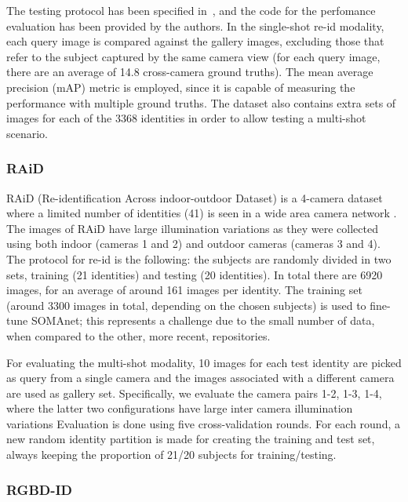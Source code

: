 \documentclass[10pt,journal,letterpaper,compsoc]{IEEEtran}
\begin{document}

The testing protocol has been specified in~\cite{market}, and the code for the perfomance evaluation has been provided by the authors. In the single-shot re-id modality, each query image is compared against the gallery images, excluding those that refer to the subject captured by the same camera view (for each query image, there are an average of 14.8 cross-camera ground truths). The mean average precision (mAP) metric is employed, since it is capable of measuring the performance with multiple ground truths.
The dataset also contains extra sets of images for each of the 3368 identities in order to allow testing a multi-shot scenario.




\subsubsection{RAiD}
RAiD (Re-identification Across indoor-outdoor Dataset) is a 4-camera dataset where a limited number of identities (41) is seen in a wide area camera network \cite{Das2014}. The images of RAiD  have  large  illumination  variations  as  they  were  collected  using  both indoor  (cameras  1  and  2)  and  outdoor  cameras  (cameras  3  and  4). The protocol for re-id is the following: the subjects are randomly divided  in two sets, training (21 identities) and testing (20 identities). In total there are 6920 images, for an average of around 161 images per identity.  The training set (around 3300 images in total, depending on the chosen subjects) is used to fine-tune SOMAnet; this represents a challenge due to the small number of data, when compared to the other, more recent, repositories.

For evaluating the multi-shot modality, 10 images for each test identity are picked as query from a single camera and the images associated with a different camera are used as gallery set. Specifically, we evaluate the camera pairs 1-2, 1-3, 1-4, where the latter two configurations have large inter camera illumination variations
Evaluation is done using five cross-validation rounds. For each round, a new random identity partition is made for creating the training and test set, always keeping the proportion of 21/20 subjects for training/testing.

\subsubsection{RGBD-ID}\label{Sec:RGBDdataset}
\end{document}
